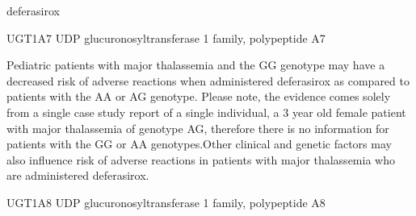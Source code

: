 \documentclass{resume} %
\begin{document}
\begin{rSection}{ deferasirox }
\begin{rSubsection}{ UGT1A7 }{ UDP glucuronosyltransferase 1 family, polypeptide A7 }{}{}
\item[] Pediatric patients with major thalassemia and the GG genotype may have a decreased risk of adverse reactions when administered deferasirox as compared to patients with the AA or AG genotype. Please note, the evidence comes solely from a single case study report of a single individual, a 3 year old female patient with major thalassemia of genotype AG, therefore there is no information for patients with the GG or AA genotypes.Other clinical and genetic factors may also influence risk of adverse reactions in patients with major thalassemia who are administered deferasirox.
\end{rSubsection}\begin{rSubsection}{ UGT1A8 }{ UDP glucuronosyltransferase 1 family, polypeptide A8 }{}{}
\item[]


\end{rSubsection}
\end{rSection}
\end{document}
